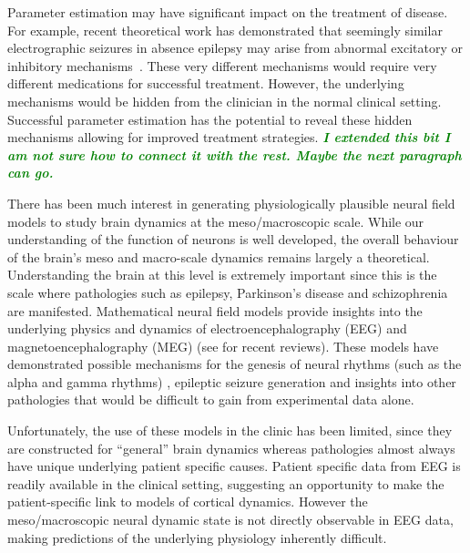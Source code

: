 \documentclass[12pt]{iopart}
\newcommand{\omg}[1]{\textsf{\emph{\textbf{\textcolor{green}{#1}}}}}
\begin{document}
Parameter estimation may have significant impact on the treatment of disease. For example, recent theoretical work has demonstrated that seemingly similar electrographic seizures in absence epilepsy may arise from abnormal excitatory or inhibitory mechanisms~\cite{marten2009derivation}. These very different mechanisms would require very different medications for successful treatment. However, the underlying mechanisms would be hidden from the clinician in the normal clinical setting. Successful parameter estimation has the potential to reveal these hidden mechanisms allowing for improved treatment strategies. \omg{I extended this bit I am not sure how to connect it with the rest. Maybe the next paragraph can go.} 
% 

There has been much interest in generating physiologically plausible neural field models to study brain dynamics at the meso/macroscopic scale. While our understanding of the function of neurons is well developed, the overall behaviour of the brain's meso and macro-scale dynamics remains largely a theoretical. Understanding the brain at this level is extremely important since this is the scale where pathologies such as epilepsy, Parkinson's disease and schizophrenia are manifested. Mathematical neural field models provide insights into the underlying physics and dynamics of electroencephalography (EEG) and magnetoencephalography (MEG) (see \cite{Deco2008,David2003} for recent reviews). These models have demonstrated possible mechanisms for the genesis of neural rhythms (such as the alpha and gamma rhythms) \cite{Liley1999,RENNIE2000}, epileptic seizure generation \cite{DaSilva2003,Suffczynski2004,Wendling2005} and insights into other pathologies \cite{Moran2008,Schiff2009} that would be difficult to gain from experimental data alone. 

Unfortunately, the use of these models in the clinic has been limited, since they are constructed for ``general'' brain dynamics whereas pathologies almost always have unique underlying patient specific causes. Patient specific data from EEG is readily available in the clinical setting, suggesting an opportunity to make the patient-specific link to models of cortical dynamics. However the meso/macroscopic neural dynamic state is not directly observable in EEG data, making predictions of the underlying physiology inherently difficult.
\end{document}
